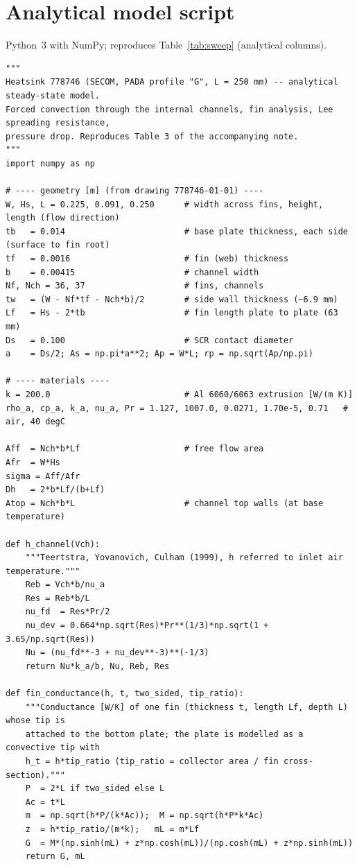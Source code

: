 \documentclass[11pt,a4paper]{article}
\begin{document}
\appendix
\section{Analytical model script}\label{app:analytic}
Python~3 with NumPy; reproduces Table~\ref{tab:sweep} (analytical columns).
\begin{lstlisting}
"""
Heatsink 778746 (SECOM, PADA profile "G", L = 250 mm) -- analytical steady-state model.
Forced convection through the internal channels, fin analysis, Lee spreading resistance,
pressure drop. Reproduces Table 3 of the accompanying note.
"""
import numpy as np

# ---- geometry [m] (from drawing 778746-01-01) ----
W, Hs, L = 0.225, 0.091, 0.250      # width across fins, height, length (flow direction)
tb   = 0.014                        # base plate thickness, each side (surface to fin root)
tf   = 0.0016                       # fin (web) thickness
b    = 0.00415                      # channel width
Nf, Nch = 36, 37                    # fins, channels
tw   = (W - Nf*tf - Nch*b)/2        # side wall thickness (~6.9 mm)
Lf   = Hs - 2*tb                    # fin length plate to plate (63 mm)
Ds   = 0.100                        # SCR contact diameter
a    = Ds/2; As = np.pi*a**2; Ap = W*L; rp = np.sqrt(Ap/np.pi)

# ---- materials ----
k = 200.0                           # Al 6060/6063 extrusion [W/(m K)]
rho_a, cp_a, k_a, nu_a, Pr = 1.127, 1007.0, 0.0271, 1.70e-5, 0.71   # air, 40 degC

Aff  = Nch*b*Lf                     # free flow area
Afr  = W*Hs
sigma = Aff/Afr
Dh   = 2*b*Lf/(b+Lf)
Atop = Nch*b*L                      # channel top walls (at base temperature)

def h_channel(Vch):
    """Teertstra, Yovanovich, Culham (1999), h referred to inlet air temperature."""
    Reb = Vch*b/nu_a
    Res = Reb*b/L
    nu_fd  = Res*Pr/2
    nu_dev = 0.664*np.sqrt(Res)*Pr**(1/3)*np.sqrt(1 + 3.65/np.sqrt(Res))
    Nu = (nu_fd**-3 + nu_dev**-3)**(-1/3)
    return Nu*k_a/b, Nu, Reb, Res

def fin_conductance(h, t, two_sided, tip_ratio):
    """Conductance [W/K] of one fin (thickness t, length Lf, depth L) whose tip is
    attached to the bottom plate; the plate is modelled as a convective tip with
    h_t = h*tip_ratio (tip_ratio = collector area / fin cross-section)."""
    P  = 2*L if two_sided else L
    Ac = t*L
    m  = np.sqrt(h*P/(k*Ac));  M = np.sqrt(h*P*k*Ac)
    z  = h*tip_ratio/(m*k);   mL = m*Lf
    G  = M*(np.sinh(mL) + z*np.cosh(mL))/(np.cosh(mL) + z*np.sinh(mL))
    return G, mL


\end{lstlisting}
\end{document}
